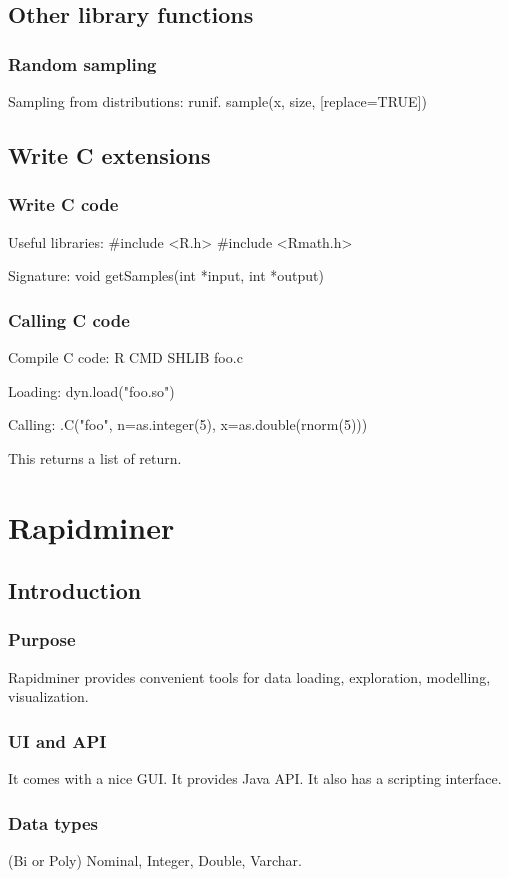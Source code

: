 \documentclass[oneside, article]{memoir}
\begin{document}
\section{Other library functions}
\subsection{Random sampling}
Sampling from distributions: runif. sample(x, size, [replace=TRUE])

\section{Write C extensions}
\subsection{Write C code}
Useful libraries: \#include <R.h> \#include <Rmath.h>

Signature: void getSamples(int *input, int *output)

\subsection{Calling C code}
Compile C code: R CMD SHLIB foo.c

Loading: dyn.load("foo.so")

Calling: .C("foo", n=as.integer(5), x=as.double(rnorm(5)))

This returns a list of return.

\chapter{Rapidminer}
\section{Introduction}
\subsection{Purpose}
Rapidminer provides convenient tools for data loading, exploration, modelling, visualization.

\subsection{UI and API}
It comes with a nice GUI. It provides Java API. It also has a scripting interface.

\subsection{Data types}
(Bi or Poly) Nominal, Integer, Double, Varchar.
\end{document}
